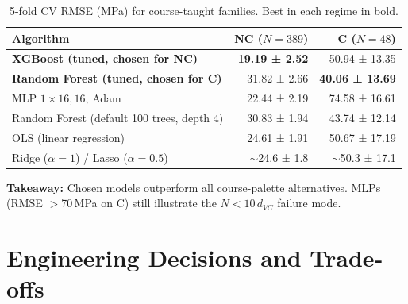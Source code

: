 \documentclass[12pt,a4paper]{article} %
\begin{document}
\begin{table}[H]
\centering
\caption{5-fold CV RMSE (MPa) for course-taught families. Best in each regime in bold.}
\label{tab:bench}
\begin{tabular}{lrr}
\toprule
\textbf{Algorithm} & \textbf{NC ($N{=}389$)} & \textbf{C ($N{=}48$)} \\
\midrule
\textbf{XGBoost (tuned, chosen for NC)}            & \textbf{19.19 ± 2.52} & 50.94 ± 13.35 \\
\textbf{Random Forest (tuned, chosen for C)}       & 31.82 ± 2.66          & \textbf{40.06 ± 13.69} \\
MLP $1\times16{,}16$, Adam                         & 22.44 ± 2.19          & 74.58 ± 16.61 \\
Random Forest (default 100 trees, depth 4)         & 30.83 ± 1.94          & 43.74 ± 12.14 \\
OLS (linear regression)                            & 24.61 ± 1.91          & 50.67 ± 17.19 \\
Ridge ($\alpha=1$) / Lasso ($\alpha=0.5$)          & $\sim$24.6 ± 1.8      & $\sim$50.3 ± 17.1 \\
\bottomrule
\end{tabular}
\end{table}

\textbf{Takeaway:} Chosen models outperform all course-palette alternatives. MLPs (RMSE $>$70\,MPa on C) still illustrate the $N < 10\,d_{VC}$ failure mode.
\section{Engineering Decisions and Trade-offs}
\end{document}
